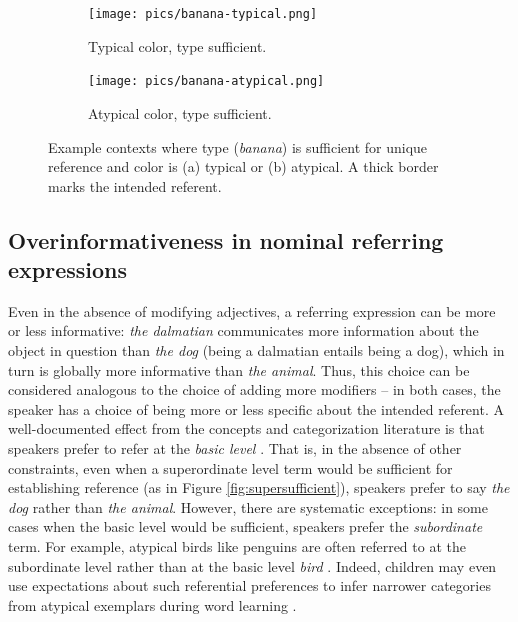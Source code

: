 \documentclass[11pt]{article}
\newcommand{\figref}[1]{Figure \ref{#1}}
\begin{document}
\begin{figure}
\begin{subfigure}{.5\textwidth}
\texttt{[image: pics/banana-typical.png]}
\caption{Typical color, type sufficient.}
\label{fig:typical}
\end{subfigure}
\begin{subfigure}{.5\textwidth}
\texttt{[image: pics/banana-atypical.png]}
\caption{Atypical color, type sufficient.}
\label{fig:atypical}
\end{subfigure}
\caption{Example contexts where type (\emph{banana}) is sufficient for unique reference and color is (a) typical or (b) atypical. A thick border marks the intended referent.}
\label{fig:banana}
\end{figure}

\subsection{Overinformativeness in nominal referring expressions}
\label{sec:nominalintro}

Even in the absence of modifying adjectives, a referring expression can be more or less informative: \emph{the dalmatian} communicates more information about the object in question than \emph{the dog} (being a dalmatian entails being a dog), which in turn is globally more informative than \emph{the animal}. 
Thus, this choice can be considered analogous to the choice of adding more modifiers -- in both cases, the speaker has a choice of being more or less specific about the intended referent. 
A well-documented effect from the concepts and categorization literature is that speakers prefer to refer at the \emph{basic level} \cite{Rosch1976, Tanaka1991}. That is, in the absence of other constraints, even when a superordinate level term would be sufficient for establishing reference (as in \figref{fig:supersufficient}), speakers prefer to say \emph{the dog} rather than \emph{the animal}. %
However, there are systematic exceptions: in some cases when the basic level would be sufficient, speakers prefer the \emph{subordinate} term.
For example, atypical birds like penguins are often referred to at the subordinate level rather than at the basic level \emph{bird} \cite{Jolicoeur1984}.
Indeed, children may even use expectations about such referential preferences to infer narrower categories from atypical exemplars during word learning \cite{emberson2019blowfish}.
\end{document}
